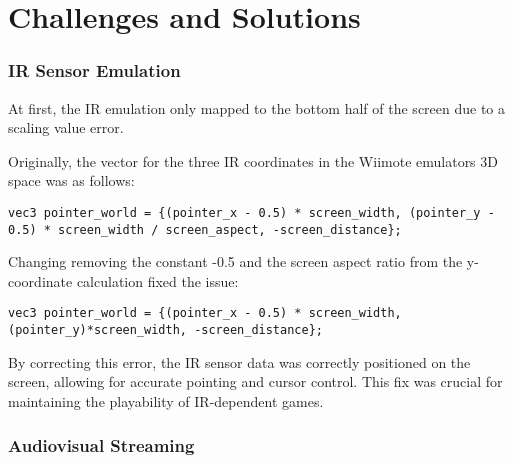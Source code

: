 \section{Challenges and Solutions}


\subsubsection{IR Sensor Emulation}
At first, the IR emulation only mapped to the bottom half of the screen due to a scaling value error.

Originally, the vector for the three IR coordinates in the Wiimote emulators 3D space was as follows:
\begin{lstlisting}[style=CStyle, emph={vec3}, emphstyle={\color{magenta}}]
vec3 pointer_world = {(pointer_x - 0.5) * screen_width, (pointer_y - 0.5) * screen_width / screen_aspect, -screen_distance};
\end{lstlisting}

Changing removing the constant -0.5 and the screen aspect ratio from the y-coordinate calculation fixed the issue:
\begin{lstlisting}[style=CStyle, emph={vec3}, emphstyle={\color{magenta}}]
vec3 pointer_world = {(pointer_x - 0.5) * screen_width, (pointer_y)*screen_width, -screen_distance};
\end{lstlisting}

By correcting this error, the IR sensor data was correctly positioned on the screen, allowing for accurate pointing and cursor control. This fix was crucial for maintaining the playability of IR-dependent games.

\subsubsection{Audiovisual Streaming}

